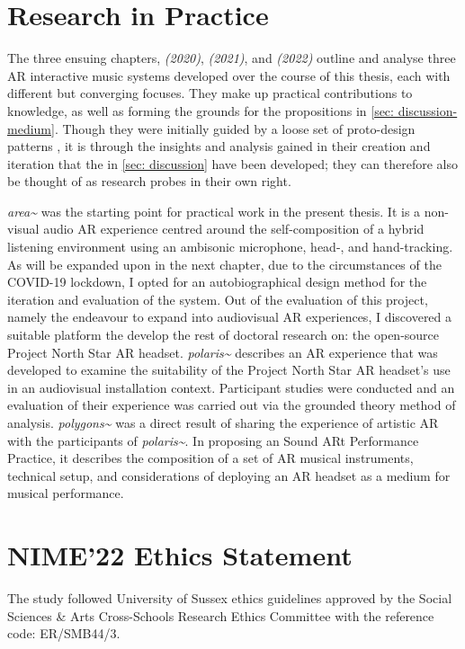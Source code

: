\section{Research in Practice}
The three ensuing chapters, \textit{ (2020)}, \textit{ (2021)}, and \textit{ (2022)} outline and analyse three AR interactive music systems developed over the course of this thesis, each with different but converging focuses. They make up practical contributions to knowledge, as well as forming the grounds for the propositions in \autoref{sec: discussion-medium}. Though they were initially guided by a loose set of proto-design patterns \citep{bilbow2020}, it is through the insights and analysis gained in their creation and iteration that the  in \autoref{sec: discussion} have been developed; they can therefore also be thought of as research probes in their own right.

\textit{area\textasciitilde{}} was the starting point for practical work in the present thesis. It is a non-visual audio AR experience centred around the self-composition of a hybrid listening environment using an ambisonic microphone, head-, and hand-tracking. As will be expanded upon in the next chapter, due to the circumstances of the COVID-19 lockdown, I opted for an autobiographical design method for the iteration and evaluation of the system. Out of the evaluation of this project, namely the endeavour to expand into audiovisual AR experiences, I discovered a suitable platform the develop the rest of doctoral research on: the open-source Project North Star AR headset. \textit{polaris\textasciitilde{}} describes an AR experience that was developed to examine the suitability of the Project North Star AR headset's use in an audiovisual installation context. Participant studies were conducted and an evaluation of their experience was carried out via the grounded theory method of analysis. \textit{polygons\textasciitilde{}} was a direct result of sharing the experience of artistic AR with the participants of \textit{polaris\textasciitilde{}}. In proposing an Sound ARt Performance Practice, it describes the composition of a set of AR musical instruments, technical setup, and considerations of deploying an AR headset as a medium for musical performance.


\section{NIME'22 Ethics Statement}\label{sec: polaris-ethics}
The study followed University of Sussex ethics guidelines approved by the Social Sciences \& Arts Cross-Schools Research Ethics Committee with the reference code: ER/SMB44/3.

